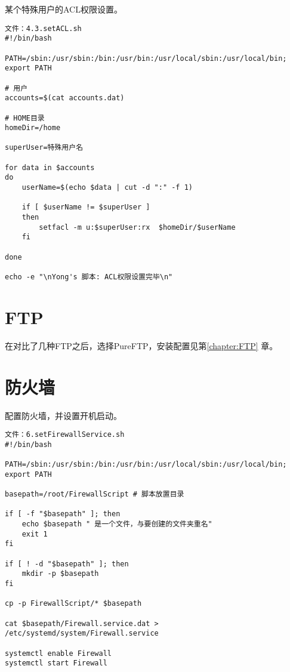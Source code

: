 某个特殊用户的ACL权限设置。
\begin{Verbatim}[]
文件：4.3.setACL.sh
#!/bin/bash

PATH=/sbin:/usr/sbin:/bin:/usr/bin:/usr/local/sbin:/usr/local/bin; export PATH

# 用户
accounts=$(cat accounts.dat)

# HOME目录
homeDir=/home

superUser=特殊用户名

for data in $accounts
do
	userName=$(echo $data | cut -d ":" -f 1)

	if [ $userName != $superUser ]
	then
		setfacl -m u:$superUser:rx	$homeDir/$userName	
	fi

done

echo -e "\nYong's 脚本: ACL权限设置完毕\n"
\end{Verbatim}

\section{FTP}
在对比了几种FTP之后，选择PureFTP，安装配置见第\ref{chapter:FTP} 章。


\section{防火墙}
配置防火墙，并设置开机启动。
\begin{Verbatim}[]
文件：6.setFirewallService.sh
#!/bin/bash

PATH=/sbin:/usr/sbin:/bin:/usr/bin:/usr/local/sbin:/usr/local/bin; export PATH

basepath=/root/FirewallScript # 脚本放置目录

if [ -f "$basepath" ]; then
	echo $basepath " 是一个文件，与要创建的文件夹重名"
	exit 1
fi

if [ ! -d "$basepath" ]; then
	mkdir -p $basepath
fi

cp -p FirewallScript/* $basepath

cat $basepath/Firewall.service.dat > /etc/systemd/system/Firewall.service

systemctl enable Firewall
systemctl start Firewall
\end{Verbatim}

